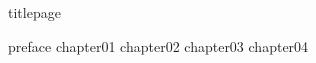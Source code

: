 \documentclass[
	,a4paper
	,12pt
	,oneside
]{book}
\begin{document}
\frontmatter
	{titlepage}
	\restoregeometry
	\tableofcontents

\mainmatter

	{preface}
	{chapter01}
	{chapter02}
	{chapter03}
	{chapter04}

\backmatter

	\printbibliography[heading=bibintoc, title={Fonti}]
\end{document}

